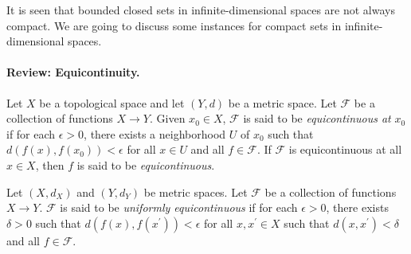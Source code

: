 \documentclass{article}
\begin{document}
It is seen that bounded closed sets in infinite-dimensional spaces are not always compact. We are going to discuss some instances for compact sets in infinite-dimensional spaces. 

\paragraph{Review: Equicontinuity.} Let $X$ be a topological space and let $(Y,d)$ be a metric space. Let $\mathcal{F}$ be a collection of functions $X\to Y$. Given $x_0\in X$, $\mathcal{F}$ is said to be \textit{equicontinuous at} $x_0$ if for each $\epsilon>0$, there exists a neighborhood $U$ of $x_0$ such that $d(f(x), f(x_0)) < \epsilon$ for all $x\in U$ and all $f\in\mathcal{F}$. If $\mathcal{F}$ is equicontinuous at all $x\in X$, then $f$ is said to be \textit{equicontinuous}.

Let $(X,d_X)$ and $(Y,d_Y)$ be metric spaces. Let $\mathcal{F}$ be a collection of functions $X\to Y$. $\mathcal{F}$ is said to be \textit{uniformly equicontinuous} if for each $\epsilon>0$, there exists $\delta>0$ such that $d(f(x),f(x^\prime))<\epsilon$ for all $x,x^\prime\in X$ such that $d(x,x^\prime)<\delta$ and all $f\in\mathcal{F}$.
\end{document}
